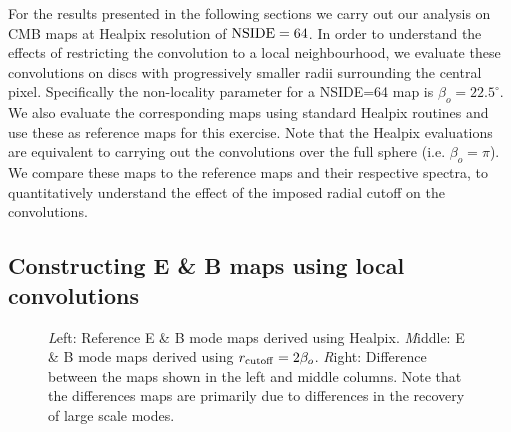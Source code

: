   For the results presented in the following sections we carry out our analysis on CMB maps at Healpix resolution of ${\rm NSIDE}=64$. In order to understand the effects of restricting the convolution to a local neighbourhood, we evaluate these convolutions on discs with progressively smaller radii surrounding the central pixel.  Specifically the non-locality parameter for a NSIDE=64 map is $\beta_o=22.5^{\circ}$. We also evaluate the corresponding maps using standard Healpix routines and use these as reference maps for this exercise. Note that the Healpix evaluations are equivalent to carrying out the convolutions over the full sphere (i.e. $\beta_o=\pi$).  We compare these maps to the reference maps and their respective spectra, to quantitatively understand the effect of the imposed radial cutoff on the convolutions.

\subsection{Constructing E \& B maps using local convolutions}

%
\begin{figure}[!h] 
\centering
{}
\caption{{\textit Left:} Reference E \& B mode maps derived using Healpix. {\textit Middle:} E \& B mode maps derived using $r_{\rm cutoff}=2\beta_o$. {\textit Right:} Difference between the maps shown in the left and middle columns. Note that the differences maps are primarily due to differences in the recovery of large scale modes.}
\label{fig:eb-maps-compare}
\end{figure}
%
%
\begin{figure}[!h] 
\centering
{}
\caption{}
\label{fig:eq-spectra_rad_cutoff}
\end{figure}
%
